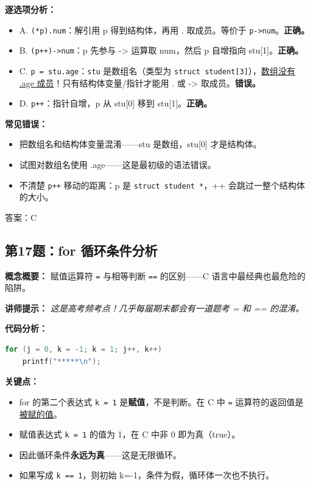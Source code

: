 \textbf{逐选项分析：}
\begin{itemize}
    \item A. \texttt{(*p).num}：解引用 p 得到结构体，再用 . 取成员。等价于 \texttt{p->num}。\textbf{正确。}
    \item B. \texttt{(p++)->num}：p 先参与 -> 运算取 num，然后 p 自增指向 stu[1]。\textbf{正确。}
    \item C. \texttt{p = stu.age}：\texttt{stu} 是数组名（类型为 \texttt{struct student[3]}），\underline{数组没有 .age 成员}！只有结构体变量/指针才能用 . 或 -> 取成员。\textbf{错误。}
    \item D. \texttt{p++}：指针自增，p 从 stu[0] 移到 stu[1]。\textbf{正确。}
\end{itemize}

\textbf{常见错误：}
\begin{itemize}
    \item 把数组名和结构体变量混淆——stu 是数组，stu[0] 才是结构体。
    \item 试图对数组名使用 .age——这是最初级的语法错误。
    \item 不清楚 \texttt{p++} 移动的距离：p 是 \texttt{struct student *}，++ 会跳过一整个结构体的大小。
\end{itemize}

{\color{highlight}答案：C}

\subsection{第17题：for 循环条件分析}

\textbf{概念概要：} 赋值运算符 \texttt{=} 与相等判断 \texttt{==} 的区别——C 语言中最经典也最危险的陷阱。

\medskip
\textbf{讲师提示：} \textit{这是高考频考点！几乎每届期末都会有一道题考 = 和 == 的混淆。}

\textbf{代码分析：}
\begin{lstlisting}[language=C]
for (j = 0, k = -1; k = 1; j++, k++)
    printf("*****\n");
\end{lstlisting}

\textbf{关键点：}
\begin{itemize}
    \item for 的第二个表达式 \texttt{k = 1} 是\textbf{赋值}，不是判断。在 C 中 \texttt{=} 运算符的返回值是\underline{被赋的值}。
    \item 赋值表达式 \texttt{k = 1} 的值为 1，在 C 中非 0 即为真（true）。
    \item 因此循环条件\textbf{永远为真}——这是无限循环。
    \item 如果写成 \texttt{k == 1}，则初始 k=-1，条件为假，循环体一次也不执行。
\end{itemize}

